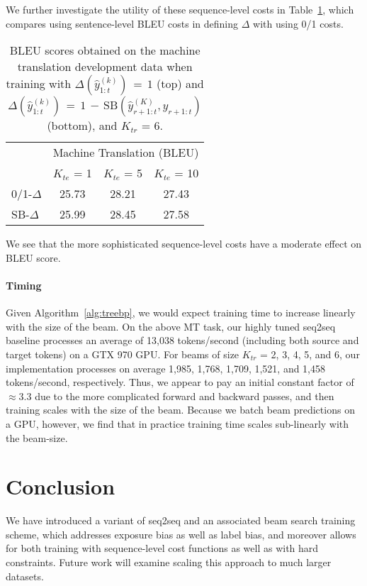 \documentclass[11pt,letterpaper]{article}
\newcommand{\beampred}[2]{\ensuremath{\hat{y}_{1:{#1}}^{({#2})}}}
\newcommand{\niceq}{\ensuremath{\,{=}\,}}
\begin{document}
We further investigate the utility of these sequence-level costs in Table~\ref{tab:mtdelt}, which compares using sentence-level BLEU costs in defining $\Delta$ with using 0/1 costs.
\begin{table}[t!]
  \centering
  \begin{tabular}{lccc}
    \toprule
    & \multicolumn{3}{c}{Machine Translation (BLEU)} \\ 
     &  $K_{te}$ = 1 & $K_{te}$ = 5 & $K_{te}$ = 10 \\ 
    \midrule
    0/1-$\Delta$ & 25.73  & 28.21 & 27.43  \\  
        SB-$\Delta$ & 25.99  & 28.45 & 27.58 \\  
    \bottomrule
  \end{tabular}
  \caption{BLEU scores obtained on the machine translation development data when training with $\Delta(\beampred{t}{k}) \niceq 1$ (top) and $\Delta(\beampred{t}{k}) \niceq 1 \,{-}\,\mathrm{SB}(\hat{y}_{r+1:t}^{({K})}, y_{r+1:t})$ (bottom), and $K_{tr}$ = 6. }
\label{tab:mtdelt}
\end{table}
We see that the more sophisticated sequence-level costs have a moderate effect on BLEU score.

\paragraph{Timing}
Given Algorithm~\ref{alg:treebp}, we would expect training time to increase linearly with the size of the beam. On the above MT task, our highly tuned seq2seq baseline processes an average of 13,038 tokens/second (including both source and target tokens) on a GTX 970 GPU. For beams of size $K_{tr}$ = 2, 3, 4, 5, and 6, our implementation processes on average 1,985, 1,768, 1,709, 1,521, and 1,458 tokens/second, respectively. Thus, we appear to pay an initial constant factor of $\approx 3.3$ due to the more complicated forward and backward passes, and then training scales with the size of the beam. Because we batch beam predictions on a GPU, however, we find that in practice training time scales sub-linearly with the beam-size. 

\section{Conclusion}
We have introduced a variant of seq2seq and an associated beam search training scheme, which addresses exposure bias as well as label bias, and moreover allows for both training with sequence-level cost functions as well as with hard constraints. Future work will examine scaling this approach to much larger datasets.
\end{document}
